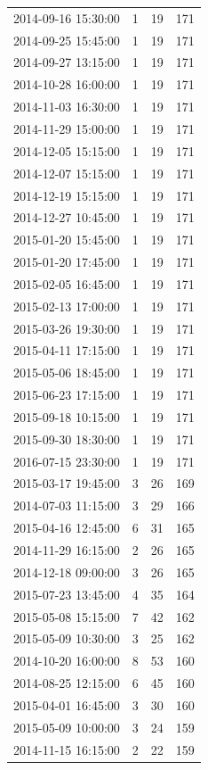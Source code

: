 \begin{tabular}{lrrr}
2014-09-16 15:30:00 & 1 & 19 & 171 \\
2014-09-25 15:45:00 & 1 & 19 & 171 \\
2014-09-27 13:15:00 & 1 & 19 & 171 \\
2014-10-28 16:00:00 & 1 & 19 & 171 \\
2014-11-03 16:30:00 & 1 & 19 & 171 \\
2014-11-29 15:00:00 & 1 & 19 & 171 \\
2014-12-05 15:15:00 & 1 & 19 & 171 \\
2014-12-07 15:15:00 & 1 & 19 & 171 \\
2014-12-19 15:15:00 & 1 & 19 & 171 \\
2014-12-27 10:45:00 & 1 & 19 & 171 \\
2015-01-20 15:45:00 & 1 & 19 & 171 \\
2015-01-20 17:45:00 & 1 & 19 & 171 \\
2015-02-05 16:45:00 & 1 & 19 & 171 \\
2015-02-13 17:00:00 & 1 & 19 & 171 \\
2015-03-26 19:30:00 & 1 & 19 & 171 \\
2015-04-11 17:15:00 & 1 & 19 & 171 \\
2015-05-06 18:45:00 & 1 & 19 & 171 \\
2015-06-23 17:15:00 & 1 & 19 & 171 \\
2015-09-18 10:15:00 & 1 & 19 & 171 \\
2015-09-30 18:30:00 & 1 & 19 & 171 \\
2016-07-15 23:30:00 & 1 & 19 & 171 \\
2015-03-17 19:45:00 & 3 & 26 & 169 \\
2014-07-03 11:15:00 & 3 & 29 & 166 \\
2015-04-16 12:45:00 & 6 & 31 & 165 \\
2014-11-29 16:15:00 & 2 & 26 & 165 \\
2014-12-18 09:00:00 & 3 & 26 & 165 \\
2015-07-23 13:45:00 & 4 & 35 & 164 \\
2015-05-08 15:15:00 & 7 & 42 & 162 \\
2015-05-09 10:30:00 & 3 & 25 & 162 \\
2014-10-20 16:00:00 & 8 & 53 & 160 \\
2014-08-25 12:15:00 & 6 & 45 & 160 \\
2015-04-01 16:45:00 & 3 & 30 & 160 \\
2015-05-09 10:00:00 & 3 & 24 & 159 \\
2014-11-15 16:15:00 & 2 & 22 & 159 \\

\end{tabular}
